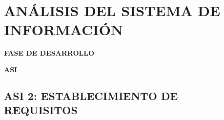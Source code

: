 \newpage
\chapter{ANÁLISIS DEL SISTEMA DE INFORMACIÓN}
	\vspace{2cm}	
	\begin{center}
	{\Large \textbf{FASE DE DESARROLLO} \par}
	\end{center}
	\vspace{5cm}
	
	\begin{center}
	\Huge \textbf{ASI}\par
	\end{center}





\newpage
\section{ASI 2: ESTABLECIMIENTO DE REQUISITOS}




%
%
%



